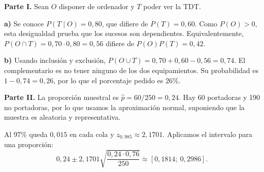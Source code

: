 \textbf{Parte I.} Sean $O$ disponer de ordenador y $T$ poder ver la TDT.

\textbf{a)} Se conoce $P(T\mid O)=0{,}80$, que difiere de $P(T)=0{,}60$. Como $P(O)>0$, esta desigualdad prueba que los sucesos son dependientes. Equivalentemente, $P(O\cap T)=0{,}70\cdot0{,}80=0{,}56$ difiere de $P(O)P(T)=0{,}42$.

\textbf{b)} Usando inclusión y exclusión, $P(O\cup T)=0{,}70+0{,}60-0{,}56=0{,}74$. El complementario es no tener ninguno de los dos equipamientos. Su probabilidad es $1-0{,}74=0{,}26$, por lo que el porcentaje pedido es $\boxed{26\%}$.

\textbf{Parte II.} La proporción muestral es $\hat p=60/250=0{,}24$. Hay 60 portadoras y 190 no portadoras, por lo que usamos la aproximación normal, suponiendo que la muestra es aleatoria y representativa.

Al $97\%$ queda $0{,}015$ en cada cola y $z_{0{,}985}\approx2{,}1701$. Aplicamos el intervalo para una proporción:
\[
 0{,}24\pm2{,}1701\sqrt{\frac{0{,}24\cdot0{,}76}{250}}
 \approx\boxed{[0{,}1814;\ 0{,}2986]}.
\]
